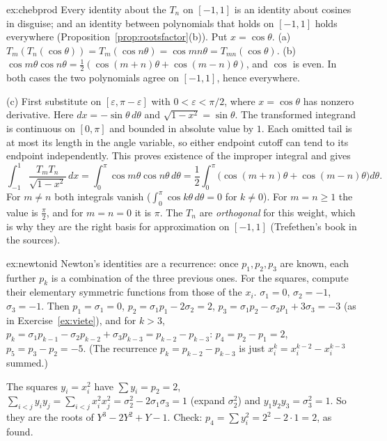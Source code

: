 \begin{solution}{ex:chebprod}
\idea Every identity about the $T_n$ on $[-1,1]$ is an identity about cosines in disguise; and an identity between polynomials that holds on $[-1,1]$ holds everywhere (Proposition~\ref{prop:rootsfactor}(b)).
\writeup Put $x=\cos\theta$. (a) $T_m(T_n(\cos\theta))=T_m(\cos n\theta)=\cos mn\theta=T_{mn}(\cos\theta)$. (b) $\cos m\theta\cos n\theta=\frac12(\cos(m+n)\theta+\cos(m-n)\theta)$, and $\cos$ is even. In both cases the two polynomials agree on $[-1,1]$, hence everywhere.

(c) First substitute on $[\varepsilon,\pi-\varepsilon]$ with $0<\varepsilon<\pi/2$, where $x=\cos\theta$ has nonzero derivative. Here $dx=-\sin\theta\,d\theta$ and $\sqrt{1-x^2}=\sin\theta$. The transformed integrand is continuous on $[0,\pi]$ and bounded in absolute value by $1$. Each omitted tail is at most its length in the angle variable, so either endpoint cutoff can tend to its endpoint independently. This proves existence of the improper integral and gives
\[
\int_{-1}^1\frac{T_mT_n}{\sqrt{1-x^2}}\,dx=\int_0^\pi\cos m\theta\cos n\theta\,d\theta=\frac12\int_0^\pi\bigl(\cos(m+n)\theta+\cos(m-n)\theta\bigr)d\theta.
\]
For $m\ne n$ both integrals vanish ($\int_0^\pi\cos k\theta\,d\theta=0$ for $k\ne0$). For $m=n\ge1$ the value is $\frac\pi2$, and for $m=n=0$ it is $\pi$.
The $T_n$ are \emph{orthogonal} for this weight, which is why they are the right basis for approximation on $[-1,1]$ (Trefethen's book in the sources).
\end{solution}

\begin{solution}{ex:newtonid}
\idea Newton's identities are a recurrence: once $p_1,p_2,p_3$ are known, each further $p_k$ is a combination of the three previous ones. For the squares, compute their elementary symmetric functions from those of the $x_i$.
\writeup $\sigma_1=0$, $\sigma_2=-1$, $\sigma_3=-1$. Then $p_1=\sigma_1=0$, $p_2=\sigma_1p_1-2\sigma_2=2$, $p_3=\sigma_1p_2-\sigma_2p_1+3\sigma_3=-3$ (as in Exercise~\ref{ex:viete}), and for $k>3$, $p_k=\sigma_1p_{k-1}-\sigma_2p_{k-2}+\sigma_3p_{k-3}=p_{k-2}-p_{k-3}$:
$p_4=p_2-p_1=2$, $p_5=p_3-p_2=-5$. (The recurrence $p_k=p_{k-2}-p_{k-3}$ is just $x_i^k=x_i^{k-2}-x_i^{k-3}$ summed.)

The squares $y_i=x_i^2$ have $\sum y_i=p_2=2$, $\sum_{i<j}y_iy_j=\sum_{i<j}x_i^2x_j^2=\sigma_2^2-2\sigma_1\sigma_3=1$ (expand $\sigma_2^2$) and $y_1y_2y_3=\sigma_3^2=1$. So they are the roots of $Y^3-2Y^2+Y-1$. Check: $p_4=\sum y_i^2=2^2-2\cdot1=2$, as found.
\end{solution}

